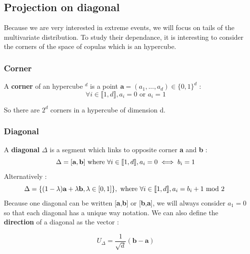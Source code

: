 \documentclass{article}
\begin{document}
   
   \subsection{Projection on diagonal}
   Because we are very interested in extreme events, we will focus on tails of the multivariate distribution. To study their dependance, it is interesting to consider the corners of the space of copulas which is an hypercube.
   \subsubsection{Corner}
  
	\begin{definition}
		A \textbf{corner} of an hypercube \begin{math} [0,1]^d \end{math} is a point \begin{math} \textbf{a}=(a_1,...,a_d) \in \{0,1\}^d \end{math} : \begin{equation*}
		\forall i \in  \llbracket 1,d \rrbracket, a_{i} = 0 \text{ or } a_{i}=1 
\end{equation*}
	\end{definition}
	So there are \begin{math} 2^d\end{math} corners in a hypercube of dimension d.\newline
	
	\subsubsection{Diagonal}	
	
	\begin{definition}
		A \textbf{diagonal} \begin{math} \Delta \end{math} is a segment which links to opposite corner \textbf{a} and \textbf{b} :
		\begin{equation*}
			\Delta =[\textbf{a},\textbf{b}]\text{ where }\newline
			\forall i \in \llbracket 1,d \rrbracket , a_i = 0 \iff b_i=1
		\end{equation*}
			Alternatively :
		\begin{equation*}
			\Delta =\{(1-\lambda)\textbf{a} + \lambda \textbf{b}, \lambda \in [0,1]\}, \text{ where }\newline
			\forall i \in \llbracket 1,d \rrbracket , a_i = b_i+ 1 \text{ mod 2 }
		\end{equation*}
	Because one diagonal can be written [\textbf{a},\textbf{b}] or [\textbf{b},\textbf{a}], we will always consider \begin{math} a_1 =0 \end{math} so that each diagonal has a unique way notation.\newline
	\newline
	We can also define the \textbf{direction} of a diagonal as the vector :

	\begin{equation*}
		U_\Delta =\frac{1}{\sqrt{d}}(\textbf{b}-\textbf{a})
	\end{equation*}
	\end{definition}	
		
\end{document}
